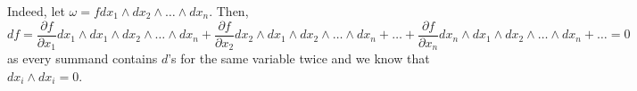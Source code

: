 \documentclass[10pt]{article} %
\title{}
\author{}
\begin{document}
\maketitle
Indeed, let $\omega=fdx_1\wedge dx_2\wedge\hdots\wedge dx_n$. Then,
\[df=\frac{\partial f}{\partial x_1}dx_1\wedge dx_1\wedge dx_2\wedge\hdots\wedge dx_n+
\frac{\partial f}{\partial x_2}dx_2\wedge dx_1\wedge dx_2\wedge\hdots\wedge dx_n+\dots+
\frac{\partial f}{\partial x_n}dx_n\wedge dx_1\wedge dx_2\wedge\hdots\wedge dx_n+\dots=0\]
as every summand contains $d$'s for the same variable twice and we know that $dx_i\wedge dx_i=0$.
\end{document}
